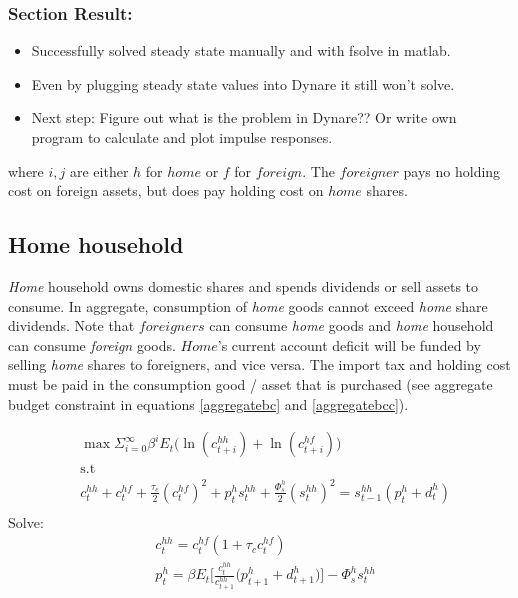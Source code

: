 \documentclass[a4paper]{article}
\begin{document}
\subsubsection{Section Result:}
\begin{itemize}
\item Successfully solved steady state manually and with fsolve in matlab. 
\item Even by plugging steady state values into Dynare it still won't solve. 
\item Next step: Figure out what is the problem in Dynare?? Or write own program to calculate and plot impulse responses. 
\end{itemize}



where $i,j$ are either $h$ for $home$ or $f$ for $foreign$. The $foreigner$ pays no holding cost on foreign assets, but does pay holding cost on $home$ shares. 


\subsection{Home household}
\emph{Home} household owns domestic shares and spends dividends or sell assets to consume. In aggregate, consumption of \emph{home} goods cannot exceed \emph{home} share dividends. Note that $foreigners$ can consume \emph{home} goods and \emph{home} household can consume \emph{foreign} goods. $Home$'s current account deficit will be funded by selling \emph{home} shares to foreigners, and vice versa. The import tax and holding cost must be paid in the consumption good / asset that is purchased (see aggregate budget constraint in equations \ref{aggregatebc} and \ref{aggregatebcc}).
 
 
 



\begin{align*}
&\max \Sigma_{i=0}^\infty \beta^i E_t \bigg(\ln(c^{hh}_{t+i})+ \ln(c^{hf}_{t+i}) \bigg)\\ &\text{s.t}\\
&c^{hh}_t+c^{hf}_t + \frac{\tau_c}{2} (c^{hf}_t)^2 + p^{h}_t s^{hh}_t+\frac{\Phi^h_s}{2}(s^{hh}_t)^2 =s^{hh}_{t-1}(p^{h}_t+d^{h}_t)\\
\end{align*}
Solve:
\begin{align}
&c^{hh}_t=c^{hf}_t(1+\tau_c c^{hf}_t)\\
&p^{h}_t=\beta E_t \bigg[\frac{c^{hh}_t}{c^{hh}_{t+1}} \bigg(  p^{h}_{t+1}+d^{h}_{t+1} \bigg) \bigg] - \Phi^h_s s^{hh}_t
\end{align}
\end{document}
